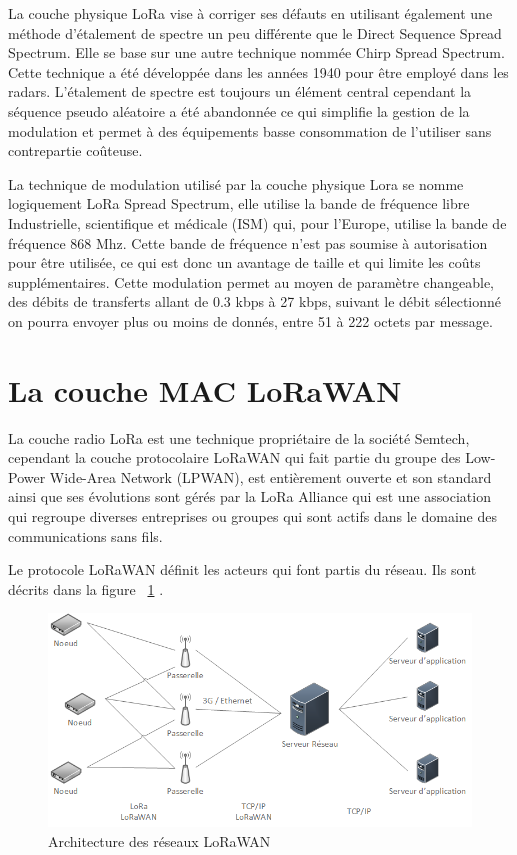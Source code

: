 La couche physique LoRa vise à corriger ses défauts en utilisant également une méthode d’étalement de spectre un peu différente que le Direct Sequence Spread Spectrum. Elle se base sur une autre technique nommée Chirp Spread Spectrum. Cette technique a été développée dans les années 1940 pour être employé dans les radars. L’étalement de spectre est toujours un élément central cependant la séquence pseudo aléatoire a été abandonnée ce qui simplifie la gestion de la modulation et permet à des équipements basse consommation de l’utiliser sans contrepartie coûteuse. \cite{lora_modulation_basics}

La technique de modulation utilisé par la couche physique Lora se nomme logiquement LoRa Spread Spectrum, elle utilise la bande de fréquence libre Industrielle, scientifique et médicale (ISM) qui, pour l’Europe, utilise la bande de fréquence 868 Mhz. Cette bande de fréquence n’est pas soumise à autorisation pour être utilisée, ce qui est donc un avantage de taille et qui limite les coûts supplémentaires. Cette modulation permet au moyen de paramètre changeable, des débits de transferts allant de 0.3 kbps à 27 kbps, suivant le débit sélectionné on pourra envoyer plus ou moins de donnés, entre 51 à 222 octets par message. \cite{limits_lorawan}

\section{La couche MAC LoRaWAN}

La couche radio LoRa est une technique propriétaire de la société Semtech, cependant la couche protocolaire LoRaWAN qui fait partie du groupe des Low-Power Wide-Area Network (LPWAN), est entièrement ouverte et son standard ainsi que ses évolutions sont gérés par la LoRa Alliance qui est une association qui regroupe diverses entreprises ou groupes qui sont actifs dans le domaine des communications sans fils.

Le protocole LoRaWAN définit les acteurs qui font partis du réseau. Ils sont décrits dans la figure ~\ref{fig:schema_lorwan} .

\begin{figure}[htb]
\centering 
\includegraphics[width=1\columnwidth]{../images/schema_lorawan.png} 
\caption[Architecture LoRaWAN]{Architecture des réseaux LoRaWAN}
\label{fig:schema_lorwan}
\end{figure}

